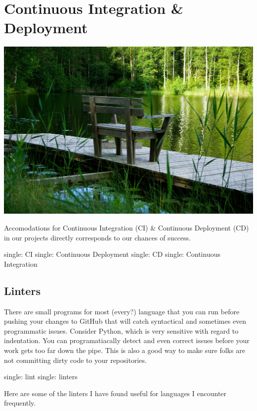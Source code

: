 \makeatletter
{}
\renewcommand{\thefigure}{\thechapter.\@arabic\c@figure}
\makeatother

\hypertarget{continuous-integration-deployment}{%
\section{Continuous Integration \&
Deployment}\label{continuous-integration-deployment}}

\includegraphics{../images/finland-905712_1920.jpg}

Accomodations for Continuous Integration (CI) \& Continuous Deployment
(CD) in our projects directly corresponds to our chances of success.

single: CI single: Continuous Deployment single: CD single: Continuous
Integration

\hypertarget{linters}{%
\subsection{Linters}\label{linters}}

There are small programs for most (every?) language that you can run
before pushing your changes to GitHub that will catch syntactical and
sometimes even programmatic issues. Consider Python, which is very
sensitive with regard to indentation. You can programatiacally detect
and even correct issues before your work gets too far down the pipe.
This is also a good way to make sure folks are not committing dirty code
to your repositories.

single: lint single: linters

Here are some of the linters I have found useful for languages I
encounter frequently.

